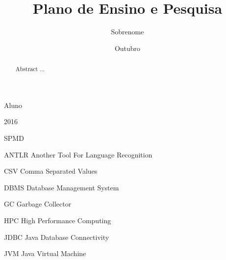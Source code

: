 \documentclass[cic,tc,english]{iiufrgs}
\date{}
\title{}
\begin{document}
\title{Plano de Ensino e Pesquisa}
\author{Sobrenome}{Aluno}

\date{Outubro}{2016}



%
%

\maketitle

\begin{abstract}
Abstract ...
\end{abstract}

\listoffigures
\listoftables

\begin{listofabbrv}{SPMD}
   \item[ANTLR] Another Tool For Language Recognition
   \item[CSV] Comma Separated Values
   \item [DBMS] Database Management System    
   \item[GC] Garbage Collector 
   \item[HPC] High Performance Computing
   \item[JDBC] Java Database Connectivity
   \item[JVM] Java Virtual Machine
\end{listofabbrv}
\end{document}
